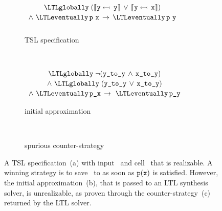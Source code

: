 \medskip

\label{ex:asLTL}

\begin{figure*}[t]
    \centering
    \begin{subfigure}[t]{0.28\textwidth}
      \centering
      $ \begin{array}{c}
          \\[-0.5em]
          \LTLglobally \; (\upd{\name{y}}{\name{y}} \, \vee \, \upd{\name{y}}{\name{x}}) \\[0.2em]
          \wedge \ \LTLeventually \, \name{p} \ \name{x} \, \impl \,
          \LTLeventually \, \name{p}\ \name{y} \\[-0.5em]
          \
        \end{array} $
        \caption{TSL specification}
\label{eq:tslSimple}
    \end{subfigure}%
    ~ ~
    \begin{subfigure}[t]{0.30\textwidth}
      \centering
      $ \begin{array}{c}
          \LTLglobally \; \neg ( \name{y\_to\_y} \, \wedge \, \name{x\_to\_y}) \\[0.2em]
          \wedge \ \LTLglobally \; (\name{y\_to\_y} \, \vee \, \name{x\_to\_y}) \\[0.2em]
          \wedge \ \LTLeventually \, \name{p\_x} \, \impl \
          \LTLeventually \, \name{p\_y}
        \end{array} $
\caption{initial approximation}
\label{eq:ltlSimple}
    \end{subfigure}%
    ~\;
    \begin{subfigure}[t]{0.35\textwidth}
      \centering
      \vspace{-1em}
  \vspace{1.1em}
\caption{spurious counter-strategy}
\label{eq:tslSimpleSoln}
    \end{subfigure}
    \caption{
      A TSL specification~(a) with input~ and cell~ that is realizable. A winning strategy is to save~ to  as soon as $ {\text{\texttt{p}}}({\text{\texttt{x}}}) $ is satisfied. However, the initial approximation~(b), that is passed to an LTL synthesis solver, is unrealizable, as proven through the counter-strategy~(c) returned by the LTL solver.}
    \label{fig:approx}
\end{figure*}

